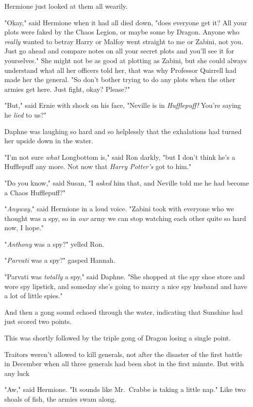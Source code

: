 Hermione just looked at them all wearily.

"Okay," said Hermione when it had all died down, "does everyone get it? All
your plots were faked by the Chaos Legion, or maybe some by Dragon. Anyone who
\emph{really} wanted to betray Harry or Malfoy went straight to me or Zabini,
not you. Just go ahead and compare notes on all your secret plots and you'll
see it for yourselves." She might not be as good at plotting as Zabini, but she
could always understand what all her officers told her, that was why Professor
Quirrell had made her the general. "So don't bother trying to do any plots when
the other armies get here. Just fight, okay? Please?"

"But," said Ernie with shock on his face, "Neville is in \emph{Hufflepuff!}
You're saying he \emph{lied} to us?"

Daphne was laughing so hard and so helplessly that the exhalations had turned
her upside down in the water.

"I'm not sure \emph{what} Longbottom is," said Ron darkly, "but I don't think
he's a Hufflepuff any more. Not now that \emph{Harry Potter's} got to him."

"Do you know," said Susan, "I \emph{asked} him that, and Neville told me he had
become a Chaos Hufflepuff?"

"\emph{Anyway}," said Hermione in a loud voice. "Zabini took with everyone who
we thought was a spy, so in \emph{our} army we can stop watching each other
quite so hard now, I hope."

"\emph{Anthony} was a spy?" yelled Ron.

"\emph{Parvati} was a spy?" gasped Hannah.

"Parvati was \emph{totally} a spy," said Daphne. "She shopped at the spy shoe
store and wore spy lipstick, and someday she's going to marry a nice spy
husband and have a lot of little spies."

And then a gong sound echoed through the water, indicating that Sunshine had
just scored two points.

This was shortly followed by the triple gong of Dragon losing a single point.

Traitors weren't allowed to kill generals, not after the disaster of the first
battle in December when all three generals had been shot in the first minute.
But with any luck{\el}

"Aw," said Hermione. "It sounds like Mr.~Crabbe is taking a little nap."
\sbreak
Like two shoals of fish, the armies swam along.

